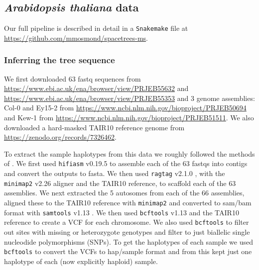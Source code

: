 \documentclass[12pt]{article}
\begin{document}
\subsection*{\textit{Arabidopsis thaliana} data}

Our full pipeline is described in detail in a \texttt{Snakemake} \citep{molder2021sustainable} file at \url{https://github.com/mmosmond/spacetrees-ms}.

\subsubsection*{Inferring the tree sequence}

We first downloaded 63 fastq sequences from \url{https://www.ebi.ac.uk/ena/browser/view/PRJEB55632} and \url{https://www.ebi.ac.uk/ena/browser/view/PRJEB55353} \citep{wlodzimierz2023cycles} and 3 genome assemblies: Col-0 and Ey15-2 from \url{https://www.ncbi.nlm.nih.gov/bioproject/PRJEB50694} and  Kew-1 from \url{https://www.ncbi.nlm.nih.gov/bioproject/PRJEB51511}.
We also downloaded a hard-masked TAIR10 reference genome from \url{https://zenodo.org/records/7326462}.

To extract the sample haplotypes from this data we roughly followed the methods of \cite{wlodzimierz2023cycles}.
We first used \texttt{hifiasm} v0.19.5 \citep{cheng2021haplotype,cheng2022haplotype} to assemble each of the 63 fastqs into contigs and convert the outputs to fasta.
We then used \texttt{ragtag} v2.1.0 \citep{alonge2022automated}, with the \texttt{minimap2} v2.26 \citep{li2018minimap2,li2021new} aligner and the TAIR10 reference, to scaffold each of the 63 assemblies.
We next extracted the 5 autosomes from each of the 66 assemblies, aligned these to the TAIR10 reference with \texttt{minimap2} and converted to sam/bam format with \texttt{samtools} v1.13 \citep{danecek2021twelve}.
We then used \texttt{bcftools} v1.13 \citep{danecek2021twelve} and the TAIR10 reference to create a VCF for each chromosome.
We also used \texttt{bcftools} to filter out sites with missing or heterozygote genotypes and filter to just biallelic single nucleodide polymorphisms (SNPs).
To get the haplotypes of each sample we used \texttt{bcftools} to convert the VCFs to hap/sample format and from this kept just one haplotype of each (now explicitly haploid) sample.
\end{document}
